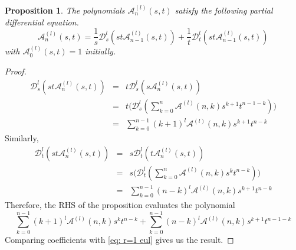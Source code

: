 \documentclass{article}
\newcommand{\dd}{\mathcal{D}}
\newcommand{\eul}{\mathcal{A}}
\newtheorem{proposition}[theorem]{Proposition}
\theoremstyle{definition}
\numberwithin{equation}{section}
\begin{document}
\begin{proposition}\label{prop: diff-recurrence}
    The polynomials $\eul^{(l)}_n(s,t)$ satisfy the following partial differential equation.
    \begin{equation}
        \eul^{(l)}_n(s,t)= \frac{1}{s} \dd_s^l(st\eul^{(l)}_{n-1}(s,t))+ \frac{1}{t} \dd_t^l(st\eul^{(l)}_{n-1}(s,t))
    \end{equation}
    with $\eul^{(l)}_0(s,t)=1$ initially.
\end{proposition}
\begin{proof}
    \begin{eqnarray*}
        \dd_s^l(st\eul^{(l)}_{n}(s,t)) & = & t \dd_s^l(s\eul^{(l)}_{n}(s,t))\\
        & = & t\bigg( \dd_s^l(\sum_{k=0}^{n} \eul^{(l)}(n,k) s^{k+1} t^{n-1-k}) \bigg)\\ 
        & = & \sum_{k=0}^{n-1}(k+1)^l\eul^{(l)}(n,k) s^{k+1} t^{n-k}
    \end{eqnarray*}
    Similarly,
    \begin{eqnarray*}
        \dd_t^l(st\eul^{(l)}_{n}(s,t)) & = & s \dd_t^l(t\eul^{(l)}_{n}(s,t))\\
        & = & s\bigg( \dd_t^l(\sum_{k=0}^{n} \eul^{(l)}(n,k) s^{k} t^{n-k}) \bigg)\\ 
        & = & \sum_{k=0}^{n-1}(n-k)^l\eul^{(l)}(n,k) s^{k+1} t^{n-k}
    \end{eqnarray*}
    Therefore, the RHS of the proposition evaluates the polynomial
    \begin{equation*}
        \sum_{k=0}^{n-1}(k+1)^l\eul^{(l)}(n,k) s^{k} t^{n-k}+\sum_{k=0}^{n-1}(n-k)^l\eul^{(l)}(n,k) s^{k+1} t^{n-1-k}
    \end{equation*}
    Comparing coefficients with \eqref{eq: r=1 eul} gives us the result. 
\end{proof}
\end{document}
